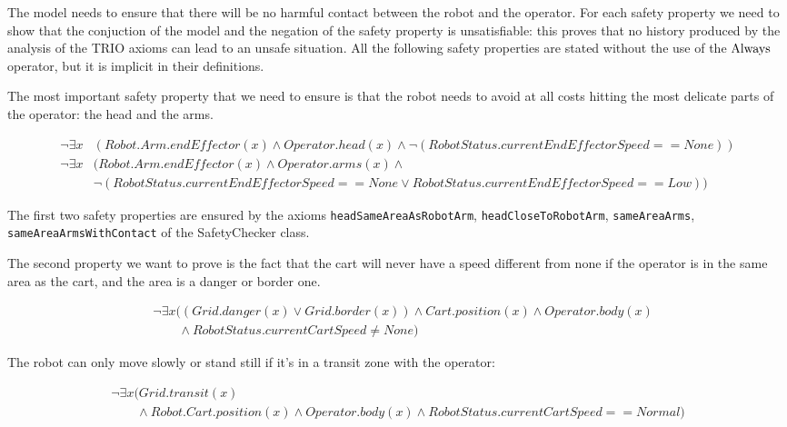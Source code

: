 The model needs to ensure that there will be no harmful contact between the robot and the operator. For each safety property we need to show that the conjuction of the model and the negation of the safety property is unsatisfiable: this proves that no history produced by the analysis of the TRIO axioms can lead to an unsafe situation. All the following safety properties are stated without the use of the $\operatorname{Always}$ operator, but it is implicit in their definitions.

The most important safety property that we need to ensure is that the robot needs to avoid at all costs hitting the most delicate parts of the operator: the head and the arms.

\begin{align*}
\neg \exists x &(Robot.Arm.endEffector(x) \land Operator.head(x) \land \neg (RobotStatus.currentEndEffectorSpeed == None)) \\
\neg \exists x &(Robot.Arm.endEffector(x) \land Operator.arms(x) \land \\
&\neg (RobotStatus.currentEndEffectorSpeed == None \lor RobotStatus.currentEndEffectorSpeed == Low)) 
\end{align*}

The first two safety properties are ensured by the axioms \texttt{headSameAreaAsRobotArm}, \texttt{headCloseToRobotArm}, \texttt{sameAreaArms}, \texttt{sameAreaArmsWithContact} of the SafetyChecker class.


The second property we want to prove is the fact that the cart will never have a speed different from none if the operator is in the same area as the cart, and the area is a danger or border one.

\begin{align*}
  &\neg \exists x ((Grid.danger(x) \lor Grid.border(x)) \land Cart.position(x) \land Operator.body(x) \\
  &\qquad \land RobotStatus.currentCartSpeed \neq None)
\end{align*}

The robot can only move slowly or stand still if it's in a transit zone with the operator:

\begin{equation*}
  \begin{array}{l}
  \neg \exists x (Grid.transit(x) \\
  \qquad \land Robot.Cart.position(x) \land Operator.body(x) \land RobotStatus.currentCartSpeed == Normal)
  \end{array}
\end{equation*}

